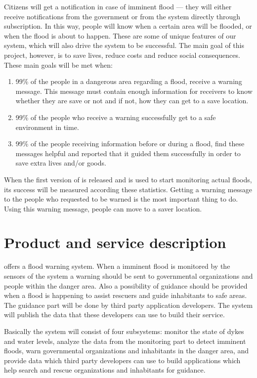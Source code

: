 Citizens will get a notification in case of imminent flood --- they will either receive notifications from the government or from the system directly through subscription. In this way, people will know when a certain area will be flooded, or when the flood is about to happen. These are some of unique features of our system, which will also drive the system to be successful. The main goal of this project, however, is to save lives, reduce costs and reduce social consequences. These main goals will be met when:
\begin{enumerate}
	\item 99\% of the people in a dangerous area regarding a flood, receive a warning message. This message must contain enough information for receivers to know whether they are save or not and if not, how they can get to a save location.
	\item 99\% of the people who receive a warning successfully get to a safe environment in time.
	\item 99\% of the people receiving information before or during a flood, find these messages helpful and reported that it guided them successfully in order to save extra lives and/or goods.
\end{enumerate}

When the first version of \ProjectName{} is released and is used to start monitoring actual floods, its success will be measured according these statistics. Getting a warning message to the people who requested to be warned is the most important thing to do. Using this warning message, people can move to a saver location.

\section{Product and service description}
\CompanyName{} offers a flood warning system. When a imminent flood is monitored by the sensors of the system a warning should be sent to governmental organizations and people within the danger area. Also a possibility of guidance should be provided when a flood is happening to assist rescuers and guide inhabitants to safe areas. The guidance part will be done by third party application developers. The system will publish the data that these developers can use to build their service.

Basically the system will consist of four subsystems: monitor the state of dykes and water levels, analyze the data from the monitoring part to detect imminent floods, warn governmental organizations and inhabitants in the danger area, and provide data which third party developers can use to build applications which help search and rescue organizations and inhabitants for guidance.


